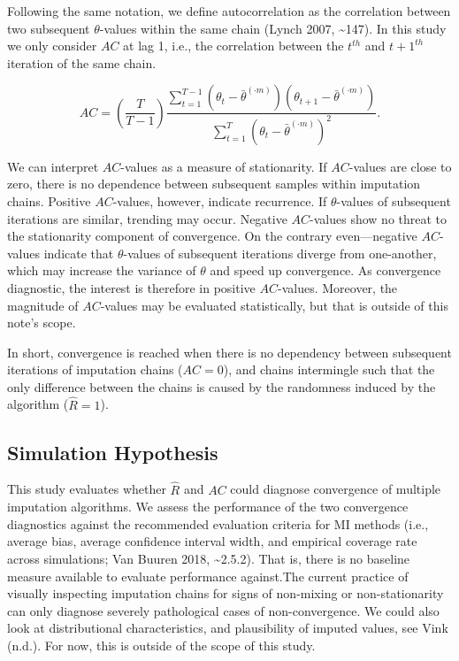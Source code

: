 \documentclass[
  Royal, times, sageapa]{sagej}
\begin{document}
Following the same notation, we define autocorrelation as the
correlation between two subsequent \(\theta\)-values within the same
chain (Lynch 2007, \textasciitilde147). In this study we only consider
\(AC\) at lag 1, i.e., the correlation between the \(t^{th}\) and
\(t+1^{th}\) iteration of the same chain.

\begin{equation*}
AC = \left( \frac{T}{T-1} \right) \frac{\sum_{t=1}^{T-1}(\theta_t - \bar{\theta}^{(\cdot m)})(\theta_{t+1} - \bar{\theta}^{(\cdot m)})}{\sum_{t=1}^{T}(\theta_t - \bar{\theta}^{(\cdot m)})^2}.
\end{equation*}

We can interpret \(AC\)-values as a measure of stationarity. If
\(AC\)-values are close to zero, there is no dependence between
subsequent samples within imputation chains. Positive \(AC\)-values,
however, indicate recurrence. If \(\theta\)-values of subsequent
iterations are similar, trending may occur. Negative \(AC\)-values show
no threat to the stationarity component of convergence. On the contrary
even---negative \(AC\)-values indicate that \(\theta\)-values of
subsequent iterations diverge from one-another, which may increase the
variance of \(\theta\) and speed up convergence. As convergence
diagnostic, the interest is therefore in positive \(AC\)-values.
Moreover, the magnitude of \(AC\)-values may be evaluated statistically,
but that is outside of this note's scope.

In short, convergence is reached when there is no dependency between
subsequent iterations of imputation chains (\(AC = 0\)), and chains
intermingle such that the only difference between the chains is caused
by the randomness induced by the algorithm (\(\widehat{R} = 1\)).

\hypertarget{simulation-hypothesis}{%
\subsection{Simulation Hypothesis}\label{simulation-hypothesis}}

This study evaluates whether \(\widehat{R}\) and \(AC\) could diagnose
convergence of multiple imputation algorithms. We assess the performance
of the two convergence diagnostics against the recommended evaluation
criteria for MI methods (i.e., average bias, average confidence interval
width, and empirical coverage rate across simulations; Van Buuren 2018,
\textasciitilde2.5.2). That is, there is no baseline measure available
to evaluate performance against.The current practice of visually
inspecting imputation chains for signs of non-mixing or non-stationarity
can only diagnose severely pathological cases of non-convergence. We
could also look at distributional characteristics, and plausibility of
imputed values, see Vink (n.d.). For now, this is outside of the scope
of this study.
\end{document}
